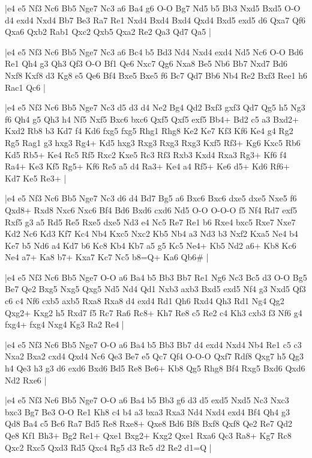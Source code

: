 \whitename{}
\blackname{}
\makegametitle
|e4 e5 Nf3 Nc6 Bb5 Nge7 Nc3 a6 Ba4 g6 O-O Bg7 Nd5 b5 Bb3 Nxd5 Bxd5 O-O d4 exd4 Nxd4 Bb7 Be3 Ra7 Re1 Nxd4 Bxd4 Bxd4 Qxd4 Bxd5 exd5 d6 Qxa7 Qf6 Qxa6 Qxb2 Rab1 Qxc2 Qxb5 Qxa2 Re2 Qa3 Qd7 Qa5  |

\whitename{}
\blackname{}
\makegametitle
|e4 e5 Nf3 Nc6 Bb5 Nge7 Nc3 a6 Bc4 b5 Bd3 Nd4 Nxd4 exd4 Nd5 Nc6 O-O Bd6 Re1 Qh4 g3 Qh3 Qf3 O-O Bf1 Qe6 Nxc7 Qg6 Nxa8 Be5 Nb6 Bb7 Nxd7 Bd6 Nxf8 Kxf8 d3 Kg8 e5 Qe6 Bf4 Bxe5 Bxe5 f6 Bc7 Qd7 Bb6 Nb4 Re2 Bxf3 Ree1 h6 Rac1 Qc6  |

\whitename{}
\blackname{}
\makegametitle
|e4 e5 Nf3 Nc6 Bb5 Nge7 Nc3 d5 d3 d4 Ne2 Bg4 Qd2 Bxf3 gxf3 Qd7 Qg5 h5 Ng3 f6 Qh4 g5 Qh3 h4 Nf5 Nxf5 Bxc6 bxc6 Qxf5 Qxf5 exf5 Bb4+ Bd2 c5 a3 Bxd2+ Kxd2 Rb8 b3 Kd7 f4 Kd6 fxg5 fxg5 Rhg1 Rhg8 Ke2 Ke7 Kf3 Kf6 Ke4 g4 Rg2 Rg5 Rag1 g3 hxg3 Rg4+ Kd5 hxg3 Rxg3 Rxg3 Rxg3 Kxf5 Rf3+ Kg6 Kxc5 Rb6 Kd5 Rb5+ Ke4 Rc5 Rf5 Rxc2 Kxe5 Rc3 Rf3 Rxb3 Kxd4 Rxa3 Rg3+ Kf6 f4 Ra4+ Ke3 Kf5 Rg5+ Kf6 Re5 a5 d4 Ra3+ Ke4 a4 Rf5+ Ke6 d5+ Kd6 Rf6+ Kd7 Ke5 Re3+  |

\whitename{}
\blackname{}
\makegametitle
|e4 e5 Nf3 Nc6 Bb5 Nge7 Nc3 d6 d4 Bd7 Bg5 a6 Bxc6 Bxc6 dxe5 dxe5 Nxe5 f6 Qxd8+ Rxd8 Nxc6 Nxc6 Bf4 Bd6 Bxd6 cxd6 Nd5 O-O O-O-O f5 Nf4 Rd7 exf5 Rxf5 g3 a5 Rd5 Re5 Rxe5 dxe5 Nd3 e4 Nc5 Re7 Re1 b6 Rxe4 bxc5 Rxe7 Nxe7 Kd2 Nc6 Kd3 Kf7 Kc4 Nb4 Kxc5 Nxc2 Kb5 Nb4 a3 Nd3 b3 Nxf2 Kxa5 Ne4 b4 Ke7 b5 Nd6 a4 Kd7 b6 Kc8 Kb4 Kb7 a5 g5 Kc5 Ne4+ Kb5 Nd2 a6+ Kb8 Kc6 Ne4 a7+ Ka8 b7+ Kxa7 Kc7 Nc5 b8=Q+ Ka6 Qb6\#  |

\whitename{}
\blackname{}
\makegametitle
|e4 e5 Nf3 Nc6 Bb5 Nge7 O-O a6 Ba4 b5 Bb3 Bb7 Re1 Ng6 Nc3 Bc5 d3 O-O Bg5 Be7 Qe2 Bxg5 Nxg5 Qxg5 Nd5 Nd4 Qd1 Nxb3 axb3 Bxd5 exd5 Nf4 g3 Nxd5 Qf3 c6 c4 Nf6 cxb5 axb5 Rxa8 Rxa8 d4 exd4 Rd1 Qh6 Rxd4 Qh3 Rd1 Ng4 Qg2 Qxg2+ Kxg2 h5 Rxd7 f5 Rc7 Ra6 Rc8+ Kh7 Re8 c5 Re2 c4 Kh3 cxb3 f3 Nf6 g4 fxg4+ fxg4 Nxg4 Kg3 Ra2 Re4  |

\whitename{}
\blackname{}
\makegametitle
|e4 e5 Nf3 Nc6 Bb5 Nge7 O-O a6 Ba4 b5 Bb3 Bb7 d4 exd4 Nxd4 Nb4 Re1 c5 c3 Nxa2 Bxa2 cxd4 Qxd4 Nc6 Qe3 Be7 e5 Qc7 Qf4 O-O-O Qxf7 Rdf8 Qxg7 h5 Qg3 h4 Qe3 h3 g3 d6 exd6 Bxd6 Bd5 Re8 Be6+ Kb8 Qg5 Rhg8 Bf4 Rxg5 Bxd6 Qxd6 Nd2 Rxe6  |

\whitename{}
\blackname{}
\makegametitle
|e4 e5 Nf3 Nc6 Bb5 Nge7 O-O a6 Ba4 b5 Bb3 g6 d3 d5 exd5 Nxd5 Nc3 Nxc3 bxc3 Bg7 Be3 O-O Re1 Kh8 c4 b4 a3 bxa3 Rxa3 Nd4 Nxd4 exd4 Bf4 Qh4 g3 Qd8 Ba4 c5 Bc6 Ra7 Bd5 Re8 Rxe8+ Qxe8 Bd6 Bf8 Bxf8 Qxf8 Qe2 Re7 Qd2 Qe8 Kf1 Bh3+ Bg2 Re1+ Qxe1 Bxg2+ Kxg2 Qxe1 Rxa6 Qc3 Ra8+ Kg7 Rc8 Qxc2 Rxc5 Qxd3 Rd5 Qxc4 Rg5 d3 Re5 d2 Re2 d1=Q  |

